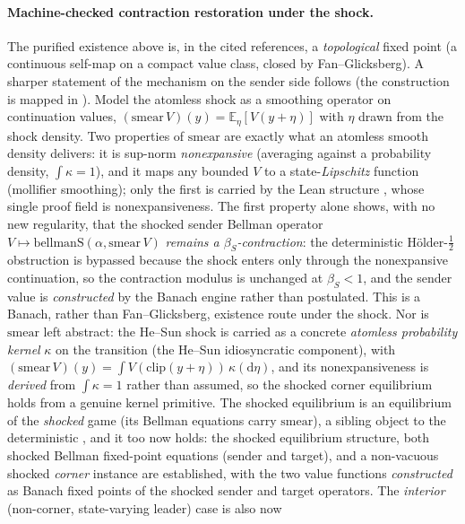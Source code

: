 \paragraph{Machine-checked contraction restoration under the shock.}
The purified existence above is, in the cited references, a
\emph{topological} fixed point (a continuous self-map on a compact value
class, closed by Fan--Glicksberg). A sharper statement of the mechanism on the sender side follows (the construction is mapped in ). Model
the atomless shock as a smoothing operator on continuation values,
$(\mathrm{smear}\,V)(y)=\mathbb{E}_\eta[V(y+\eta)]$ with $\eta$ drawn from the shock
density. Two properties of $\mathrm{smear}$ are exactly what an atomless
smooth density delivers: it is sup-norm \emph{nonexpansive} (averaging
against a probability density, $\int\kappa=1$), and it maps any bounded $V$
to a state-\emph{Lipschitz} function (mollifier smoothing); only the first is
carried by the Lean structure , whose single proof field is
nonexpansiveness. The first
property alone shows, with no new regularity, that the shocked sender
Bellman operator $V\mapsto\mathrm{bellmanS}(\alpha,\mathrm{smear}\,V)$
\emph{remains a $\beta_S$-contraction}: the deterministic
H\"older-$\tfrac12$ obstruction is bypassed because the shock enters only
through the nonexpansive continuation, so the contraction modulus is
unchanged at $\beta_S<1$, and the sender value is \emph{constructed} by the
Banach engine rather than postulated.
This is a Banach, rather than Fan--Glicksberg, existence route under
the shock. Nor is $\mathrm{smear}$ left abstract: the He--Sun shock is
carried as a concrete \emph{atomless probability kernel} $\kappa$ on the
transition (the He--Sun idiosyncratic component), with
$(\mathrm{smear}\,V)(y)=\int V(\mathrm{clip}(y+\eta))\,\kappa(\mathrm d\eta)$,
and its nonexpansiveness is \emph{derived} from $\int\kappa=1$ rather than
assumed, so the shocked corner equilibrium holds from a genuine kernel
primitive. The shocked equilibrium is an equilibrium of the \emph{shocked} game (its
Bellman equations carry $\mathrm{smear}$), a sibling object to the
deterministic , and it too now holds: the
shocked equilibrium structure, both shocked Bellman fixed-point equations
(sender and target), and a non-vacuous shocked \emph{corner} instance are
established, with the two value functions \emph{constructed} as Banach
fixed points of the shocked sender and target operators. The \emph{interior} (non-corner, state-varying leader) case is also now
